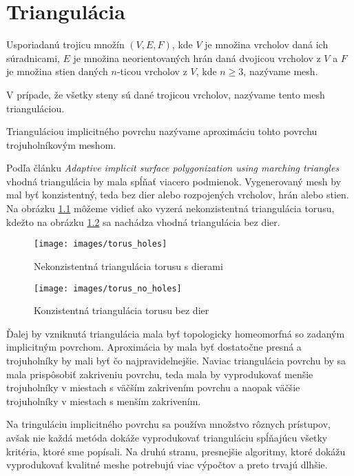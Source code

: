 \chapter{Triangulácia}

Usporiadanú trojicu množín $(V, E, F)$, kde $V$ je množina vrcholov daná ich súradnicami, 
$E$ je množina neorientovaných hrán daná 
dvojicou vrcholov z $V$ a $F$ je množina stien daných $n$-ticou vrcholov z $V$, kde $n \geq 3$, 
nazývame mesh.

V prípade, že všetky steny sú dané trojicou vrcholov, nazývame tento mesh trianguláciou.

Trianguláciou implicitného povrchu nazývame aproximáciu tohto povrchu trojuholníkovým meshom.

Podľa článku \textit{Adaptive implicit surface polygonization using marching triangles} \cite{akkouche2001adaptive}
vhodná triangulácia by mala spĺňať viacero podmienok. Vygenerovaný mesh by mal byť konzistentný, 
teda bez dier alebo rozpojených vrcholov, hrán alebo stien. Na obrázku \ref{obr:torus_holes}
môžeme vidieť ako vyzerá nekonzistentná triangulácia torusu, kdežto na obrázku \ref{obr:torus_no_holes}
sa nachádza vhodná triangulácia bez dier. 

\begin{figure}
    \centerline{\texttt{[image: images/torus\_holes]}}
    \caption[Nekonzistentná triangulácia torusu s dierami]{Nekonzistentná triangulácia torusu s dierami}
    \label{obr:torus_holes}
\end{figure}

\begin{figure}
    \centerline{\texttt{[image: images/torus\_no\_holes]}}
    \caption[Konzistentná triangulácia torusu bez dier]{Konzistentná triangulácia torusu bez dier}
    \label{obr:torus_no_holes}
\end{figure}

Ďalej by vzniknutá triangulácia mala byť topologicky homeomorfná 
so zadaným implicitným povrchom. Aproximácia by mala byť dostatočne presná a trojuholníky by mali 
byť čo najpravidelnejšie. Naviac triangulácia povrchu by sa mala prispôsobiť zakriveniu povrchu,
teda mala by vyprodukovať menšie trojuholníky v miestach s väčším zakrivením povrchu a naopak väčšie
trojuholníky v miestach s menším zakrivením.

Na tringuláciu implicitného povrchu sa používa množstvo rôznych prístupov, avšak nie každá metóda
dokáže vyprodukovať trianguláciu spĺňajúcu všetky kritéria, ktoré sme popísali. Na druhú stranu, 
presnejšie algoritmy, ktoré dokážu vyprodukovať kvalitné meshe potrebujú viac výpočtov a preto
trvajú dlhšie. 

